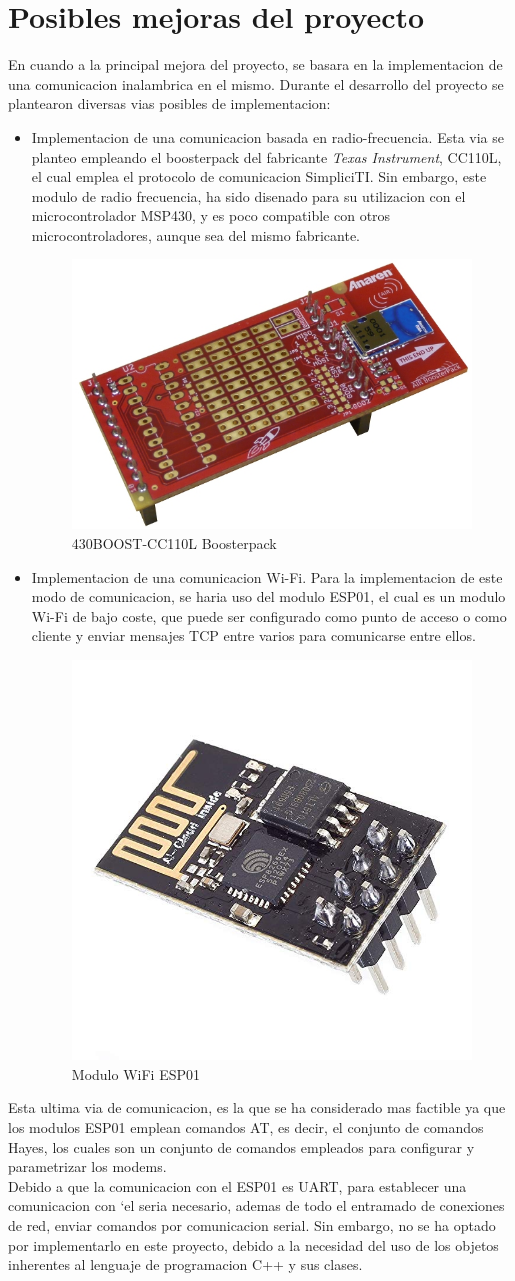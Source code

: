 \documentclass[a4paper,twoside]{article}
\begin{document}
\newpage
\section{Posibles mejoras del proyecto}
En cuando a la principal mejora del proyecto, se basara en la implementacion de una comunicacion inalambrica en el mismo. Durante el desarrollo del proyecto se plantearon diversas vias posibles de implementacion:
\begin{itemize}
\item Implementacion de una comunicacion basada en radio-frecuencia. Esta via se planteo empleando el boosterpack del fabricante \textit{Texas Instrument}, CC110L, el cual emplea el protocolo de comunicacion SimpliciTI. Sin embargo, este modulo de radio frecuencia, ha sido disenado para su utilizacion con el microcontrolador MSP430, y es poco compatible con otros microcontroladores, aunque sea del mismo fabricante. \\
\begin{figure}[h!]
 \centering
 \includegraphics[width=.3\textwidth]{../images/rf_bp}
 \caption{430BOOST-CC110L Boosterpack}
\end{figure}

\item Implementacion de una comunicacion Wi-Fi. Para la implementacion de este modo de comunicacion, se haria uso del modulo ESP01, el cual es un modulo Wi-Fi de bajo coste, que puede ser configurado como punto de acceso o como cliente y enviar mensajes TCP entre varios para comunicarse entre ellos. \\
\begin{figure}[h!]
 \centering
 \includegraphics[width=.2\textwidth]{../images/esp8266}
 \caption{Modulo WiFi ESP01}
\end{figure}
\end{itemize}

Esta ultima via de comunicacion, es la que se ha considerado mas factible ya que los modulos ESP01 emplean comandos AT, es decir, el conjunto de comandos Hayes, los cuales son un conjunto de comandos empleados para configurar y parametrizar los modems. \\
Debido a que la comunicacion con el ESP01 es UART, para establecer una comunicacion con `el seria necesario, ademas de todo el entramado de conexiones de red, enviar comandos por comunicacion serial. Sin embargo, no se ha optado por implementarlo en este proyecto, debido a la necesidad del uso de los objetos inherentes al lenguaje de programacion C++ y sus clases.
\end{document}
